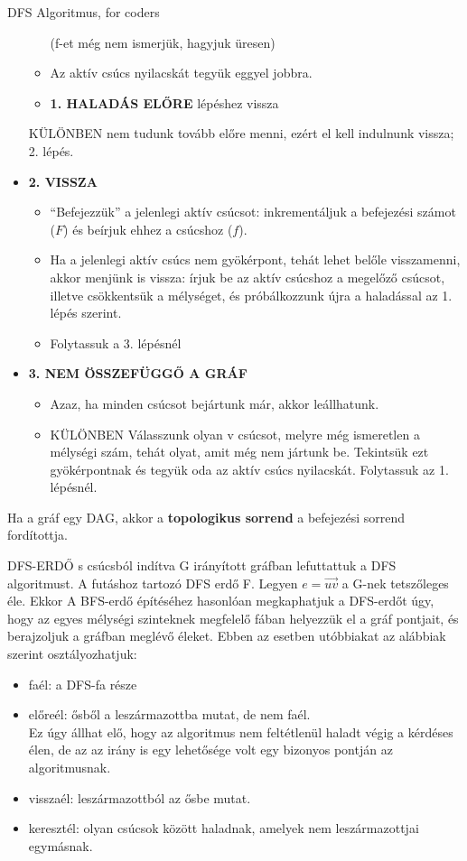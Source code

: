 \begin{tetel}{DFS Algoritmus, for coders}
\begin{itemize}
\begin{itemize}
    (f-et még nem ismerjük, hagyjuk üresen)

  \item Az aktív csúcs nyilacskát tegyük eggyel jobbra.

	\item \textbf{1. HALADÁS ELŐRE} lépéshez vissza
	\end{itemize}
    KÜLÖNBEN nem tudunk tovább előre menni, ezért el kell indulnunk vissza; 2. lépés.
\item{\textbf{2. VISSZA}}
  \begin{itemize}
  \item ``Befejezzük'' a jelenlegi aktív csúcsot: inkrementáljuk a befejezési számot ($F$) és beírjuk ehhez a csúcshoz ($f$).
  \item Ha a jelenlegi aktív csúcs nem gyökérpont, tehát lehet belőle visszamenni, akkor menjünk is vissza: írjuk be az aktív csúcshoz a megelőző csúcsot, illetve csökkentsük a mélységet, és próbálkozzunk újra a haladással az 1. lépés szerint.
  \item Folytassuk a 3. lépésnél
  \end{itemize}
\item \textbf{3. NEM ÖSSZEFÜGGŐ A GRÁF}
  \begin{itemize}
  \item Azaz, ha minden csúcsot bejártunk már, akkor leállhatunk.
  \item KÜLÖNBEN Válasszunk olyan v csúcsot, melyre még ismeretlen a mélységi szám, tehát olyat, amit még nem jártunk be. Tekintsük ezt gyökérpontnak és tegyük oda az aktív csúcs nyilacskát. Folytassuk az 1. lépésnél.
  \end{itemize}
\end{itemize}

Ha a gráf egy DAG, akkor a \textbf{topologikus sorrend} a befejezési sorrend fordítottja.
\end{tetel}

\begin{definicio}{DFS-ERDŐ}
s csúcsból indítva G irányított gráfban lefuttattuk a DFS algoritmust. A futáshoz tartozó DFS erdő F. Legyen $e=\overrightarrow{uv}$ a G-nek tetszőleges éle. Ekkor
A BFS-erdő építéséhez hasonlóan megkaphatjuk a DFS-erdőt úgy, hogy az egyes mélységi szinteknek megfelelő fában helyezzük el a gráf pontjait, és berajzoljuk a gráfban meglévő éleket. Ebben az esetben utóbbiakat az alábbiak szerint osztályozhatjuk:
\begin{itemize}
\item faél: a DFS-fa része
\item előreél: ősből a leszármazottba mutat, de nem faél.\\
  Ez úgy állhat elő, hogy az algoritmus nem feltétlenül haladt végig a kérdéses élen, de az az irány is egy lehetősége volt egy bizonyos pontján az algoritmusnak.
\item visszaél: leszármazottból az ősbe mutat.
\item keresztél: olyan csúcsok között haladnak, amelyek nem leszármazottjai egymásnak.
\end{itemize}
\end{definicio}


